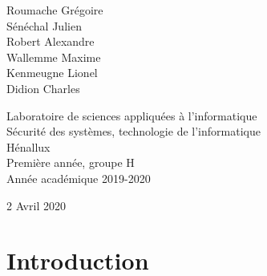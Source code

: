 \documentclass[a4paper]{article}
\begin{document}
\begin{titlepage}
\begin{sffamily}
\begin{center}
            \begin{minipage}{0.4\textwidth}
                \begin{flushleft} \large
                    Roumache Grégoire\\
                    Sénéchal Julien\\
                    Robert Alexandre\\
                    Wallemme Maxime\\
                    Kenmeugne Lionel\\
                    Didion Charles
                \end{flushleft}
            \end{minipage}
            \begin{minipage}{0.55\textwidth}
                \begin{flushright} \large
                    Laboratoire de sciences appliquées à l'informatique\\
                    Sécurité des systèmes, technologie de l'informatique\\
                    Hénallux\\
                    Première année, groupe H \\
                    Année académique 2019-2020\\
                \end{flushright}
            \end{minipage}
            \vfill

            {\large 2 Avril 2020}
        \end{center}
    \end{sffamily}
\end{titlepage}







\let\cleardoublepage\clearpage















\section{Introduction}
\end{document}
